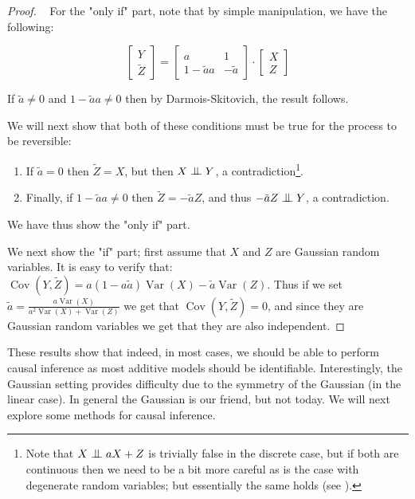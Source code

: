 \begin{proof} 
    ~
For the "only if" part, note that by simple manipulation, we have the following:

\[
    \begin{bmatrix}
        Y \\
        \tilde{Z}
    \end{bmatrix}
    =
    \begin{bmatrix}
    a & 1 \\
    1 - \tilde{a}a & -\tilde{a}
    \end{bmatrix}
    \cdot
    \begin{bmatrix}
        X \\
        Z
    \end{bmatrix}
\]

If $\tilde{a} \neq 0$ and $1 - \tilde{a}a \neq 0$ then by Darmois-Skitovich, the result follows.

We will next show that both of these conditions must be true for the process to be reversible:

\begin{enumerate}
    \item If $\tilde{a} = 0$ then $\tilde{Z} = X$, but then $X \bigCI Y$, a contradiction\footnote{
        Note that $X \bigCI aX + Z$ is trivially false 
        in the discrete case, but if both are continuous then we need to be a bit more careful as is the 
        case with degenerate random variables; but essentially the same holds (see \cite{Peters2008diploma}).
    }.
    \item Finally, if $1 - \tilde{a}a \neq 0$ then $\tilde{Z} = -\tilde{a}Z$, and thus 
    $-\tilde{a}Z \bigCI Y$, a contradiction.
\end{enumerate}

We have thus show the "only if" part. 

We next show the "if" part; first assume that $X$ and $Z$ are Gaussian random variables. 
It is easy to verify that:
$\operatorname{Cov}(Y, \tilde{Z}) = a(1 - a\tilde{a})\operatorname{Var}(X) - \tilde{a}\operatorname{Var}(Z)$.
Thus if we set $\tilde{a} = \frac{a \operatorname{Var}(X)}{a^2 \operatorname{Var}(X) + \operatorname{Var}(Z)}$ 
we get that $\operatorname{Cov}(Y, \tilde{Z}) = 0$, and since they are Gaussian random variables we get 
that they are also independent.

\end{proof}

These results show that indeed, in most cases, we should be able to perform causal inference as most 
additive models should be identifiable. Interestingly, the Gaussian setting provides difficulty  due 
to the symmetry of the Gaussian (in the linear case). In general the Gaussian is our friend, but not today.
We will next explore some methods for causal inference.

